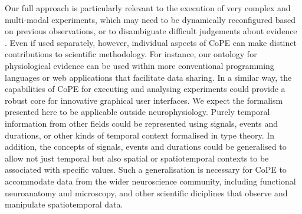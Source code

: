 Our full approach is particularly relevant to the execution of very
complex and multi-modal experiments, which may need to be dynamically
reconfigured based on previous observations, or to disambiguate
difficult judgements about evidence \citep{Kriegeskorte2009}. Even if
used separately, however, individual aspects of CoPE can make distinct
contributions to scientific methodology. For instance, our ontology
for physiological evidence can be used within more conventional
programming languages or web applications that facilitate data
sharing. In a similar way, the capabilities of CoPE for executing and
analysing experiments could provide a robust core for innovative
graphical user interfaces. We expect the formalism presented here to
be applicable outside neurophysiology. Purely temporal information
from other fields could be represented using signals, events and
durations, or other kinds of temporal context formalised in type
theory. In addition, the concepts of signals, events and durations
could be generalised to allow not just temporal but also spatial or
spatiotemporal contexts to be associated with specific values. Such a
generalisation is necessary for CoPE to accommodate data from the
wider neuroscience community, including functional neuroanatomy and
microscopy, and other scientific diciplines that observe and
manipulate spatiotemporal data.


